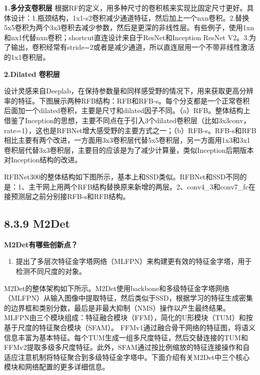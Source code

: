 \begin{figure}
\centering
\caption{}
\end{figure}

\textbf{1.多分支卷积层} ​
根据RF的定义，用多种尺寸的卷积核来实现比固定尺寸更好。具体设计：1.瓶颈结构，1x1-s2卷积减少通道特征，然后加上一个nxn卷积。2.替换5x5卷积为两个3x3卷积去减少参数，然后是更深的非线性层。有些例子，使用1xn和nx1代替nxn卷积；shortcut直连设计来自于ResNet和Inception
ResNet
V2。3.为了输出，卷积经常有stride=2或者是减少通道，所以直连层用一个不带非线性激活的1x1卷积层。

\textbf{2.Dilated 卷积层}

设计灵感来自Deeplab，在保持参数量和同样感受野的情况下，用来获取更高分辨率的特征。下图展示两种RFB结构：RFB和RFB-s。每个分支都是一个正常卷积后面加一个dilated卷积，主要是尺寸和dilated因子不同。（a）RFB。整体结构上借鉴了Inception的思想，主要不同点在于引入3个dilated卷积层（比如3x3conv，rate=1），这也是RFBNet增大感受野的主要方式之一；（b）RFB-s。RFB-s和RFB相比主要有两个改进，一方面用3x3卷积层代替5x5卷积层，另一方面用1x3和3x1卷积层代替3x3卷积层，主要目的应该是为了减少计算量，类似Inception后期版本对Inception结构的改进。

\begin{figure}
\centering
\caption{}
\end{figure}

RFBNet300的整体结构如下图所示，基本上和SSD类似。RFBNet和SSD不同的是：1、主干网上用两个RFB结构替换原来新增的两层。2、conv4\_3和conv7\_fc在接预测层之前分别接RFB-s和RFB结构。

\begin{figure}
\centering
\caption{}
\end{figure}

\subsection{8.3.9 M2Det}\label{m2det}

\textbf{M2Det有哪些创新点？}

\begin{enumerate}
\def\labelenumi{\arabic{enumi}.}
\item
  提出了多层次特征金字塔网络（MLFPN）来构建更有效的特征金字塔，用于检测不同尺度的对象。
\end{enumerate}

M2Det的整体架构如下所示。M2Det使用backbone和多级特征金字塔网络（MLFPN）从输入图像中提取特征，然后类似于SSD，根据学习的特征生成密集的边界框和类别分数，最后是非最大抑制（NMS）操作以产生最终结果。
MLFPN由三个模块组成：特征融合模块（FFM），简化的U形模块（TUM）和按基于尺度的特征聚合模块（SFAM）。
FFMv1通过融合骨干网络的特征图，将语义信息丰富为基本特征。每个TUM生成一组多尺度特征，然后交替连接的TUM和FFMv2提取多级多尺度特征。此外，SFAM通过按比例缩放的特征连接操作和自适应注意机制将特征聚合到多级特征金字塔中。下面介绍有关M2Det中三个核心模块和网络配置的更多详细信息。

